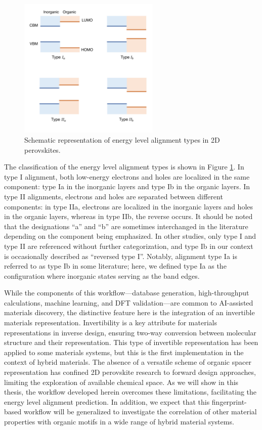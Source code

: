 \begin{figure}[htbp]
    \centering
    \includegraphics[width=0.6\textwidth]{figures/methodology/figure3-2.png}
    \caption{Schematic representation of energy level alignment types in 2D perovskites. }
    \label{fig:figure3.2}
\end{figure}

The classification of the energy level alignment types is shown in Figure \ref{fig:figure3.2}. In type I alignment, both low-energy electrons and holes are localized in the same component: type Ia in the inorganic layers and type Ib in the organic layers. In type II alignments, electrons and holes are separated between different components: in type IIa, electrons are localized in the inorganic layers and holes in the organic layers, whereas in type IIb, the reverse occurs. It should be noted that the designations “a” and “b” are sometimes interchanged in the literature depending on the component being emphasized\cite{RN18}. In other studies, only type I and type II are referenced without further categorization\cite{RN20}, and type Ib in our context is occasionally described as “reversed type I”\cite{RN606}. Notably, alignment type Ia is referred to as type Ib in some literature\cite{RN104,RN18}; here, we defined type Ia as the configuration where inorganic states serving as the band edges.

While the components of this workflow—database generation, high-throughput calculations, machine learning, and DFT validation—are common to AI-assisted materials discovery\cite{RN321,RN553}, the distinctive feature here is the integration of an invertible materials representation. Invertibility is a key attribute for materials representations in inverse design\cite{RN361}, ensuring two-way conversion between molecular structure and their representation. This type of invertible representation has been applied to some materials systems\cite{RN412,RN354}, but this is the first implementation in the context of hybrid materials. The absence of a versatile scheme of organic spacer representation has confined 2D perovskite research to forward design approaches, limiting the exploration of available chemical space. As we will show in this thesis, the workflow developed herein overcomes these limitations, facilitating the energy level alignment prediction. In addition, we expect that this fingerprint-based workflow will be generalized to investigate the correlation of other material properties with organic motifs in a wide range of hybrid material systems. 

